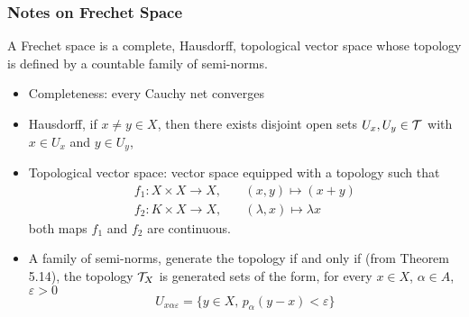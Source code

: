 \documentclass[../../main.tex]{subfiles}
\begin{document}
\subsubsection*{Notes on Frechet Space}
A Frechet space is a complete, Hausdorff, topological vector space whose topology is defined by a countable family of semi-norms.
\begin{itemize}
    \item Completeness: every Cauchy net converges
    \item Hausdorff, if $x\neq y\in X$, then there exists disjoint open sets $U_x, U_y\in\mathcal{T}$ with $x\in U_x$ and $y\in U_y$,
    \item Topological vector space: vector space equipped with a topology such that
    \begin{align*}
        f_1:X\times X\to X,&\quad (x,y)\mapsto (x+y)\\
        f_2:K\times X\to X,&\quad (\lambda, x)\mapsto \lambda x
    \end{align*}
    both maps $f_1$ and $f_2$ are continuous.
    \item A family of semi-norms, generate the topology if and only if (from Theorem 5.14), the topology $\mathcal{T}_X$ is generated sets of the form, for every $x\in X$, $\alpha\in A$, $\varepsilon>0$
    \[
    U_{x\alpha\varepsilon}=\biggl\{y\in X,\,p_\alpha(y-x)<\varepsilon\biggr\}
    \]
\end{itemize}
\newpage
\end{document}
